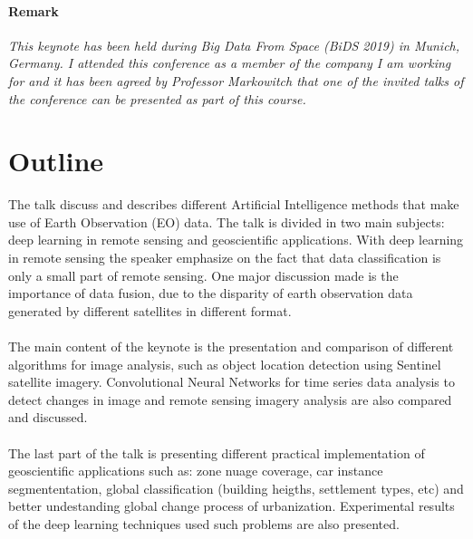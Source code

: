 \documentclass[11pt,a4paper]{article}
\begin{document}
\setcounter{section}{0}

\paragraph{Remark} \textit{This keynote has been held during Big Data From Space (BiDS 2019)  in Munich, Germany. I attended this conference as a member of the company I am working for and it has been agreed by Professor Markowitch that one of the invited talks of the conference can be presented as part of this course.}


\section{Outline}

The talk discuss and describes different Artificial Intelligence methods that make use of Earth Observation (EO) data. The talk is divided in two main subjects: deep learning in remote sensing and geoscientific applications.
With deep learning in remote sensing the speaker emphasize on the fact that data classification is only a small part of remote sensing. One major discussion made is the importance of data fusion, due to the disparity of earth observation data generated by different satellites in different format.

\paragraph{}

The main content of the keynote is the presentation and comparison of different algorithms for image analysis, such as object location detection using Sentinel  satellite imagery. Convolutional Neural Networks for time series data analysis to detect changes in image and remote sensing imagery analysis are also compared and discussed.

\paragraph{}

The last part of the talk is presenting different practical implementation of geoscientific applications such as: zone nuage coverage, car instance segmententation, global classification (building heigths, settlement types, etc) and better undestanding global change process of urbanization. Experimental results of the deep learning techniques used such problems are also presented.
\end{document}
